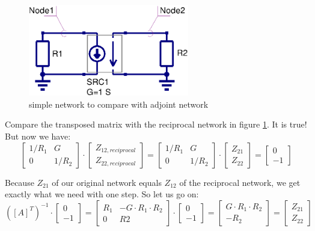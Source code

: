 \begin{figure}[ht]
\begin{center}
\includegraphics[width=7cm]{MNAnoise2}
\end{center}
\caption{simple network to compare with adjoint network}
\label{fig:mna_noise2}
\end{figure}
\FloatBarrier

Compare the transposed matrix with the reciprocal network in figure
\ref{fig:mna_noise2}.  It is true!  But now we have:
\begin{equation}
\begin{bmatrix}
1/R_1 & G\\ 0 & 1/R_2
\end{bmatrix}
\cdot
\begin{bmatrix}
Z_{12,reciprocal}\\
Z_{22,reciprocal}
\end{bmatrix}
=
\begin{bmatrix}
1/R_1 & G\\
  0   & 1/R_2
\end{bmatrix}
\cdot
\begin{bmatrix}
Z_{21}\\
Z_{22}
\end{bmatrix}
=
\begin{bmatrix}
0\\
-1
\end{bmatrix}
\end{equation}

Because $Z_{21}$ of our original network equals $Z_{12}$ of the
reciprocal network, we get exactly what we need with one step.  So let
us go on:
\begin{equation}
([A]^T)^{-1}\cdot
\begin{bmatrix}
  0\\
 -1
\end{bmatrix}
=
\begin{bmatrix}
R_1 & -G\cdot R_1\cdot R_2\\
  0 & R2
\end{bmatrix}
\cdot
\begin{bmatrix}
  0\\
 -1
\end{bmatrix}
=
\begin{bmatrix}
G\cdot R_1\cdot R_2\\
-R_2
\end{bmatrix}
=
\begin{bmatrix}
Z_{21}\\
Z_{22}
\end{bmatrix}
\end{equation}

